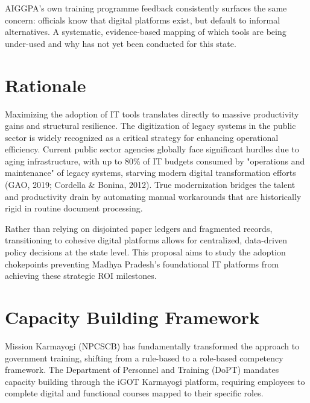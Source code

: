 \documentclass[11pt,a4paper]{article}
\begin{document}
AIGGPA's own training programme feedback consistently surfaces the
same concern: officials know that digital platforms exist, but default to informal
alternatives. A systematic, evidence-based mapping of which tools are being under-used
and why has not yet been conducted for this state.

\section{Rationale}

\vspace{0.2cm}

Maximizing the adoption of IT tools translates directly to massive productivity gains 
and structural resilience. The digitization of legacy systems in the public sector is 
widely recognized as a critical strategy for enhancing operational efficiency. 
Current public sector agencies globally face significant hurdles due to aging infrastructure, 
with up to 80\% of IT budgets consumed by "operations and maintenance" of legacy systems, 
starving modern digital transformation efforts (GAO, 2019; Cordella \& Bonina, 2012). 
True modernization bridges the talent and productivity drain by automating manual 
workarounds that are historically rigid in routine document processing.

Rather than relying on disjointed paper ledgers and fragmented records, transitioning 
to cohesive digital platforms allows for centralized, data-driven policy decisions 
at the state level. This proposal aims to study the adoption chokepoints preventing 
Madhya Pradesh's foundational IT platforms from achieving these strategic ROI milestones.

\section{Capacity Building Framework}

\vspace{0.2cm}

Mission Karmayogi (NPCSCB) has fundamentally transformed the approach to government training,
shifting from a rule-based to a role-based competency framework. The Department of 
Personnel and Training (DoPT) mandates capacity building through the iGOT Karmayogi 
platform, requiring employees to complete digital and functional courses mapped 
to their specific roles.
\end{document}
